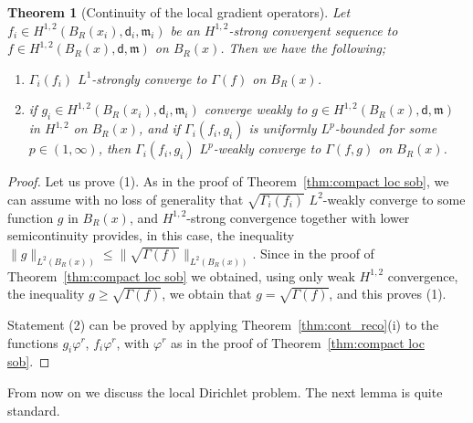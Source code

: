\documentclass[a4paper,11pt,reqno]{article}
\numberwithin{equation}{section}
\theoremstyle{plain}
\newtheorem{theorem}{Theorem}[section]
\theoremstyle{definition}
\theoremstyle{remark}
\let\altphi\phi
\let\phi\varphi
\let\varphi\altphi
\let\altphi\undefined
\newcommand{\dist}{\mathsf{d}}
\newcommand{\meas}{\mathfrak{m}}
\begin{document}
{\begin{theorem}[Continuity of the local gradient operators]\label{thm:local gradient}
Let $f_i \in H^{1, 2}(B_R(x_i), \dist_i, \meas_i)$ be an $H^{1, 2}$-strong convergent sequence to $f \in H^{1, 2}(B_R(x), \dist, \meas)$ on $B_R(x)$.  
Then we have the following;
\begin{enumerate}
\item[(1)] $\Gamma_i(f_i)$ $L^1$-strongly converge to $\Gamma(f)$ on $B_R(x)$. 
\item[(2)] if $g_i \in H^{1, 2}(B_R(x_i), \dist_i, \meas_i)$ converge weakly to $g \in H^{1, 2}(B_R(x), \dist, \meas)$ in $H^{1, 2}$ on $B_R(x)$, and
if $\Gamma_i(f_i,g_i)$ is uniformly $L^p$-bounded for some $p \in (1, \infty)$, then $\Gamma_i(f_i,g_i)$
$L^p$-weakly converge to $\Gamma( f, g)$ on $B_R(x)$.
\end{enumerate}
\end{theorem}
\begin{proof}
Let us prove (1). As in the proof of Theorem~\ref{thm:compact loc sob}, 
we can assume with no loss of generality that $\sqrt{\Gamma_i(f_i)}$ $L^2$-weakly converge to
some function $g$ in $B_R(x)$, and $H^{1,2}$-strong convergence together with lower semicontinuity
provides, in this case, the inequality $\|g\|_{L^2(B_R(x))}\leq \|\sqrt{\Gamma(f)}\|_{L^2(B_R(x))}$. Since in the proof of 
Theorem~\ref{thm:compact loc sob}
we obtained, using only weak $H^{1,2}$ convergence, the inequality $g\geq\sqrt{\Gamma(f)}$, we obtain that
$g=\sqrt{\Gamma(f)}$, and this proves (1).

Statement (2) can be proved by applying Theorem~\ref{thm:cont_reco}(i) 
to the functions $g_i\phi^r$, $f_i\phi^r$, with $\phi^r$ as in the
proof of Theorem~\ref{thm:compact loc sob}. 
\end{proof}

From now on we discuss the local Dirichlet problem. The next lemma is quite standard.

}
\end{document}

